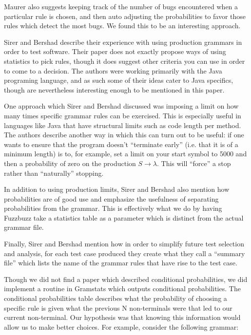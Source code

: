Maurer also suggests keeping track of the number of bugs encountered when a
particular rule is chosen, and then auto adjusting the probabilities to favor
those rules which detect the most bugs. We found this to be an interesting
approach.

Sirer and Bershad\cite{Bershad1999} describe their experience with using
production grammars in order to test software. Their paper does not exactly
propose ways of using statistics to pick rules, though it does suggest other
criteria you can use in order to come to a decision. The authors were working
primarily with the Java programing language, and as such some of their ideas
cater to Java specifics, though are nevertheless interesting enough to be
mentioned in this paper.

One approach which Sirer and Bershad discussed was imposing a limit on how many
times specific grammar rules can be exercised. This is especially useful in
languages like Java that have structural limits such as code length per
method. The authors describe another way in which this can turn out to be
useful: if one wants to ensure that the program doesn't ``terminate early''
(i.e. that it is of a minimum length) is to, for example, set a limit on your
start symbol to 5000 and then a probability of zero on the production $S
\rightarrow \lambda$. This will ``force'' a stop rather than ``naturally''
stopping.

In addition to using production limits, Sirer and Bershad also mention how
probabilities are of good use and emphasize the usefulness of separating
probabilities from the grammar. This is effectively what we do by having
Fuzzbuzz take a statistics table as a parameter which is distinct from the
actual grammar file.

Finally, Sirer and Bershad mention how in order to simplify future test
selection and analysis, for each test case produced they create what they call
a ``summary file'' which lists the name of the grammar rules that have rise to
the test case.

Though we did not find a paper which described conditional probabilities, we
did implement a routine in Gramstats which outputs conditional probabilities.
The conditional probabilities table describes what the probability of choosing a
specific rule is given what the previous N non-terminals were that led to our
current non-terminal. Our hypothesis was that knowing this information would
allow us to make better choices. For example, consider the following grammar:

